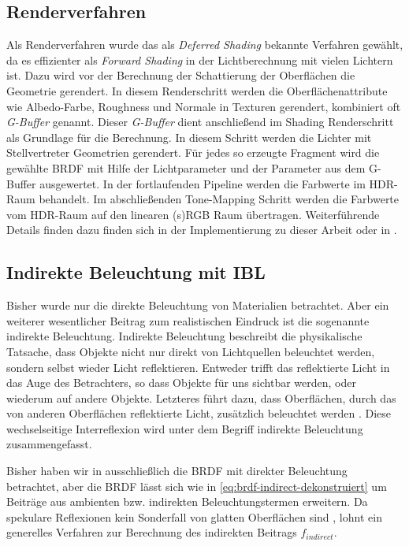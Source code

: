 \subsection{Renderverfahren}

Als Renderverfahren wurde das als \textit{Deferred Shading} bekannte Verfahren gewählt, da es effizienter als \textit{Forward Shading} in der Lichtberechnung mit vielen Lichtern ist. Dazu wird vor der Berechnung der Schattierung der Oberflächen die Geometrie gerendert. In diesem Renderschritt werden die Oberflächenattribute wie Albedo-Farbe, Roughness und Normale in Texturen gerendert, kombiniert oft \textit{G-Buffer} genannt. Dieser \textit{G-Buffer} dient anschließend im Shading Renderschritt als Grundlage für die Berechnung. In diesem Schritt werden die Lichter mit Stellvertreter Geometrien gerendert. Für jedes so erzeugte Fragment wird die gewählte \ac{BRDF} mit Hilfe der Lichtparameter und der Parameter aus dem G-Buffer ausgewertet. In der fortlaufenden Pipeline werden die Farbwerte im HDR-Raum behandelt. Im abschließenden Tone-Mapping Schritt werden die Farbwerte vom HDR-Raum auf den linearen (s)RGB Raum übertragen. Weiterführende Details finden dazu finden sich in der Implementierung zu dieser Arbeit oder in \cite{Shishkovtsov2005}.

\subsection[Indirekte Beleuchtung]{Indirekte Beleuchtung mit \acl{IBL}}\label{sec:pbr-ibl}

Bisher wurde nur die direkte Beleuchtung von Materialien betrachtet. Aber ein weiterer wesentlicher Beitrag zum realistischen Eindruck ist die sogenannte indirekte Beleuchtung. Indirekte Beleuchtung beschreibt die physikalische Tatsache, dass Objekte nicht nur direkt von Lichtquellen beleuchtet werden, sondern selbst wieder Licht reflektieren. Entweder trifft das reflektierte Licht in das Auge des Betrachters, so dass Objekte für uns sichtbar werden, oder wiederum auf andere Objekte. Letzteres führt dazu, dass Oberflächen, durch das von anderen Oberflächen reflektierte Licht, zusätzlich beleuchtet werden . Diese wechselseitige Interreflexion wird unter dem Begriff indirekte Beleuchtung zusammengefasst.

Bisher haben wir in  ausschließlich die \ac{BRDF} mit direkter Beleuchtung betrachtet, aber die \ac{BRDF} lässt sich wie in \ref{eq:brdf-indirect-dekonstruiert} um Beiträge aus ambienten bzw. indirekten Beleuchtungstermen erweitern. Da spekulare Reflexionen kein Sonderfall von glatten Oberflächen sind \parencite{Hable2010}, lohnt ein generelles Verfahren zur Berechnung des indirekten Beitrags $f_{indirect}$. 


